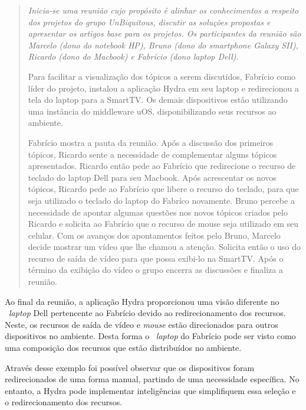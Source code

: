 	\begin{quote}
	
		\it 	
		Inicia-se uma reunião cujo propósito é alinhar os conhecimentos a respeito dos projetos do grupo 
		UnBiquitous, discutir as soluções propostas e apresentar os artigos base para os projetos. Os
		participantes da reunião são Marcelo (dono do notebook HP), Bruno (dono do smartphone Galaxy SII), Ricardo (dono do
		Macbook) e Fabrício (dono laptop Dell).
		
		Para facilitar a visualização dos tópicos a serem discutidos, Fabrício como líder do projeto,
		instalou a aplicação Hydra em seu laptop e redirecionou a tela do laptop para a SmartTV. Os
		demais dispositivos estão utilizando uma instância do middleware uOS, disponibilizando seus
		recursos ao ambiente.

		Fabrício mostra a pauta da reunião. Após a discussão dos primeiros tópicos, Ricardo sente a
		necessidade de complementar alguns tópicos apresentados. Ricardo então pede ao Fabrício que
		redirecione o recurso de teclado do laptop Dell para seu Macbook. Após acrescentar os novos
		tópicos, Ricardo pede ao Fabrício que libere o recurso do teclado, para que seja utilizado o
		teclado do laptop do Fabríco novamente. Bruno percebe a necessidade de apontar algumas questões
		nos novos tópicos criados pelo Ricardo e solicita ao Fabrício que o recurso de mouse seja
		utilizado em seu celular. Com os avanços dos apontamentos feitos pelo Bruno, Marcelo
		decide mostrar um vídeo que lhe chamou a atenção. Solicita então o uso do recurso de saída de vídeo para
		que possa exibi-lo na SmartTV. Após o término da exibição do vídeo o grupo encerra as discussões
		e finaliza a reunião.

	\end{quote}
		
	Ao final da reunião, a aplicação Hydra proporcionou uma visão diferente no ~\textit{laptop} Dell
	pertencente ao Fabrício devido ao redirecionamento dos recursos. Neste, os recursos de saída de
	vídeo e \textit{mouse} estão direcionados para outros dispositivos no ambiente. Desta forma o
	~\textit{laptop} do Fabrício pode ser visto como uma composição dos recursos que estão distribuídos
	no ambiente. 
	
	Através desse exemplo foi possível observar que os dispositivos foram redirecionados de uma
	forma manual, partindo de uma necessidade específica. No entanto, a Hydra pode implementar
	inteligências que simplifiquem essa seleção e o redirecionamento dos recursos.
	
